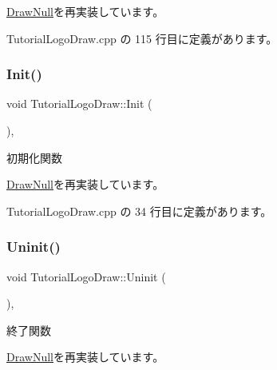 \mbox{\hyperlink{class_draw_null_a9aac059eb3b5d1f77e8bd3aa0647cff9}{Draw\+Null}}を再実装しています。



 Tutorial\+Logo\+Draw.\+cpp の 115 行目に定義があります。

\mbox{\label{class_tutorial_logo_draw_a53fc4b1b23c7f9e249600be67510f944}} 
\subsubsection{\texorpdfstring{Init()}{Init()}}
{\footnotesize\ttfamily void Tutorial\+Logo\+Draw\+::\+Init (\begin{DoxyParamCaption}{ }\end{DoxyParamCaption})\hspace{0.3cm}{\ttfamily [override]}, {\ttfamily [virtual]}}



初期化関数 



\mbox{\hyperlink{class_draw_null_a20aef1e54c1a158b741bfd731e18efdf}{Draw\+Null}}を再実装しています。



 Tutorial\+Logo\+Draw.\+cpp の 34 行目に定義があります。

\mbox{\label{class_tutorial_logo_draw_a949fb70954e3df28f87b8ed5c61bf8f1}} 
\subsubsection{\texorpdfstring{Uninit()}{Uninit()}}
{\footnotesize\ttfamily void Tutorial\+Logo\+Draw\+::\+Uninit (\begin{DoxyParamCaption}{ }\end{DoxyParamCaption})\hspace{0.3cm}{\ttfamily [override]}, {\ttfamily [virtual]}}



終了関数 



\mbox{\hyperlink{class_draw_null_a6e81d63efab7333e8d0e8af99362a4d9}{Draw\+Null}}を再実装しています。



